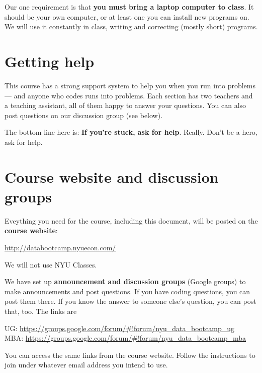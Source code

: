 \documentclass[11pt]{article}
\begin{document}
Our one requirement is that {\bf you must bring a laptop computer to class\/}.
It should be your own computer, or at least one you can install new programs on.
We will use it constantly in class, writing and correcting (mostly short) programs.


\section*{Getting help}



This course has a strong support system to help you when you run into problems ---
and anyone who codes runs into problems.
Each section has two teachers and a teaching assistant, all of them happy to answer your questions.
You  can also post questions on our discussion group (see below).

The bottom line here is:  {\bf If you're stuck, ask for help\/}.
Really.  Don't be a hero, ask for help.



\section*{Course website and discussion groups}

Eveything you need for the course, including this document, will be posted on
the {\bf course website\/}:
%
\vspace{-0.15in}
\begin{center}
\url{http://databootcamp.nyuecon.com/}
\end{center}
\vspace{-0.15in}
%
We will not use NYU Classes.

We have set up {\bf announcement and discussion groups\/} (Google groups)
to make announcements and post questions.
If you have coding questions, you can post them there.
If you know the answer to someone else's question, you can post that, too.
The links are
%
\vspace{-0.1in}
\begin{center}
UG:   \url{https://groups.google.com/forum/#!forum/nyu_data_bootcamp_ug}  \\
MBA:  \url{https://groups.google.com/forum/#!forum/nyu_data_bootcamp_mba}
\end{center}
\vspace{-0.1in}
%
You can access the same links from the course website.  Follow the instructions to join under whatever email address you intend to use.
\end{document}

